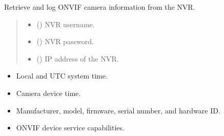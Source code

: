 \documentclass[letterpaper,10pt,english]{sphinxmanual}
\begin{document}
\begin{fulllineitems}
\label{\detokenize{modules/src.data_intake.data_intake.NVRConnection:src.data_intake.data_intake.NVRConnection.onvifCameraInfo}}
\pysigstartsignatures
\pysiglinewithargsret
{}
{\sphinxparamcomma {}\sphinxparamcomma {}}
{}
\pysigstopsignatures
\sphinxAtStartPar
Retrieve and log ONVIF camera information from the NVR.
\begin{quote}\begin{description}
\begin{itemize}
\item {} 
\sphinxAtStartPar
{} () \textendash{} NVR username.

\item {} 
\sphinxAtStartPar
{} () \textendash{} NVR password.

\item {} 
\sphinxAtStartPar
{} () \textendash{} IP address of the NVR.

\end{itemize}

\end{description}\end{quote}
\begin{description}
\begin{itemize}
\item {} 
\sphinxAtStartPar
Local and UTC system time.

\item {} 
\sphinxAtStartPar
Camera device time.

\item {} 
\sphinxAtStartPar
Manufacturer, model, firmware, serial number, and hardware ID.

\item {} 
\sphinxAtStartPar
ONVIF device service capabilities.

\end{itemize}


\end{description}
\end{fulllineitems}
\end{document}
